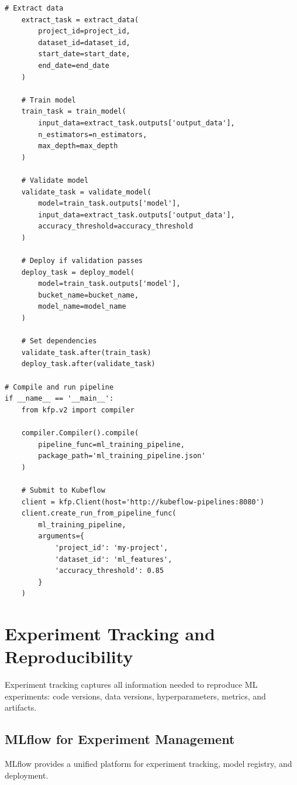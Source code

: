 \begin{lstlisting}[style=python, caption=Kubeflow Pipeline with containerized components]
    # Extract data
    extract_task = extract_data(
        project_id=project_id,
        dataset_id=dataset_id,
        start_date=start_date,
        end_date=end_date
    )

    # Train model
    train_task = train_model(
        input_data=extract_task.outputs['output_data'],
        n_estimators=n_estimators,
        max_depth=max_depth
    )

    # Validate model
    validate_task = validate_model(
        model=train_task.outputs['model'],
        input_data=extract_task.outputs['output_data'],
        accuracy_threshold=accuracy_threshold
    )

    # Deploy if validation passes
    deploy_task = deploy_model(
        model=train_task.outputs['model'],
        bucket_name=bucket_name,
        model_name=model_name
    )

    # Set dependencies
    validate_task.after(train_task)
    deploy_task.after(validate_task)

# Compile and run pipeline
if __name__ == '__main__':
    from kfp.v2 import compiler

    compiler.Compiler().compile(
        pipeline_func=ml_training_pipeline,
        package_path='ml_training_pipeline.json'
    )

    # Submit to Kubeflow
    client = kfp.Client(host='http://kubeflow-pipelines:8080')
    client.create_run_from_pipeline_func(
        ml_training_pipeline,
        arguments={
            'project_id': 'my-project',
            'dataset_id': 'ml_features',
            'accuracy_threshold': 0.85
        }
    )
\end{lstlisting}

\section{Experiment Tracking and Reproducibility}

Experiment tracking captures all information needed to reproduce ML experiments: code versions, data versions, hyperparameters, metrics, and artifacts.

\subsection{MLflow for Experiment Management}

MLflow provides a unified platform for experiment tracking, model registry, and deployment.

